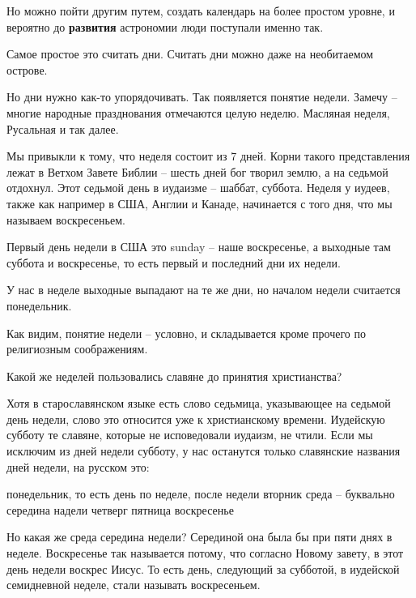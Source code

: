    Но можно пойти другим путем, создать календарь на более простом уровне, и вероятно до \textbf{развития} астрономии люди поступали именно так.

   Самое простое это считать дни. Считать дни можно даже на необитаемом острове.

   Но дни нужно как-то упорядочивать. Так появляется понятие недели. Замечу – многие народные празднования отмечаются целую неделю. Масляная неделя, Русальная и так далее.

Мы привыкли к тому, что неделя состоит из 7 дней. Корни такого представления лежат в Ветхом Завете Библии – шесть дней бог творил землю, а на седьмой отдохнул. Этот седьмой день в иудаизме – шаббат, суббота. Неделя у иудеев, также как например в США, Англии и Канаде, начинается с того дня, что мы называем воскресеньем. 

Первый день недели в США это sunday – наше воскресенье, а выходные там суббота и воскресенье, то есть первый и последний дни их недели.

У нас в неделе выходные выпадают на те же дни, но началом недели считается понедельник.

Как видим, понятие недели – условно, и складывается кроме прочего по религиозным соображениям.

Какой же неделей пользовались славяне до принятия христианства?

Хотя в старославянском языке есть слово седьмица, указывающее на седьмой день недели, слово это относится уже к христианскому времени. Иудейскую субботу те славяне, которые не исповедовали иудаизм, не чтили. Если мы исключим из дней недели субботу, у нас останутся только славянские названия дней недели, на русском это:\newline

\noindent понедельник, то есть день по неделе, после недели\newline
вторник\newline
среда – буквально середина надели\newline
четверг\newline
пятница\newline
воскресенье\newline

   Но какая же среда середина недели? Серединой она была бы при пяти днях в неделе. Воскресенье так называется потому, что согласно Новому завету, в этот день недели воскрес Иисус. То есть день, следующий за субботой, в иудейской семидневной неделе, стали называть воскресеньем.

